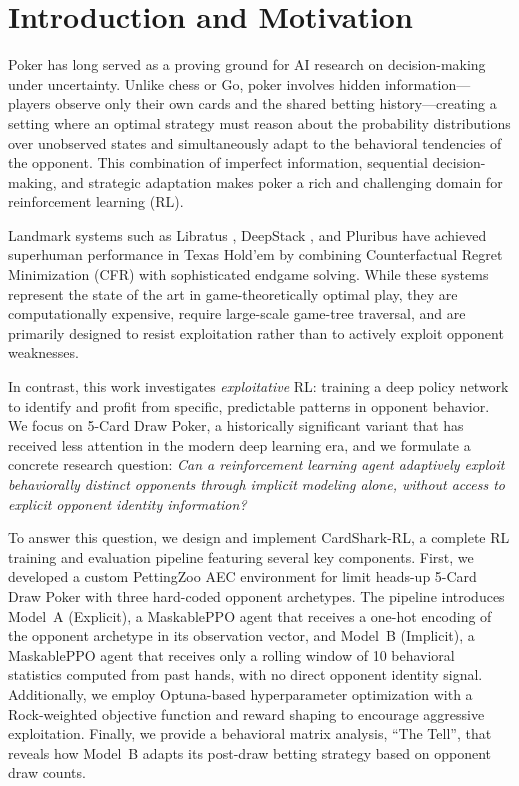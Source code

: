 \documentclass[conference]{IEEEtran}
\begin{document}
\section{Introduction and Motivation}
\label{sec:intro}

Poker has long served as a proving ground for AI research on
decision-making under uncertainty. Unlike chess or Go, poker involves
hidden information---players observe only their own cards and the
shared betting history---creating a setting where an optimal strategy
must reason about the probability distributions over unobserved states
and simultaneously adapt to the behavioral tendencies of the opponent.
This combination of imperfect information, sequential decision-making,
and strategic adaptation makes poker a rich and challenging domain for
reinforcement learning (RL).

Landmark systems such as Libratus \cite{brown2018libratus}, DeepStack
\cite{moravcik2017deepstack}, and Pluribus \cite{brown2019superhuman}
have achieved superhuman performance in Texas Hold'em by combining
Counterfactual Regret Minimization (CFR) \cite{zinkevich2007regret}
with sophisticated endgame solving. While these systems represent the
state of the art in game-theoretically optimal play, they are
computationally expensive, require large-scale game-tree traversal,
and are primarily designed to resist exploitation rather than to
actively exploit opponent weaknesses.

In contrast, this work investigates \textit{exploitative} RL:
training a deep policy network to identify and profit from specific,
predictable patterns in opponent behavior. We focus on 5-Card Draw
Poker, a historically significant variant that has received less
attention in the modern deep learning era, and we formulate a concrete
research question: \textit{Can a reinforcement learning agent
adaptively exploit behaviorally distinct opponents through implicit
modeling alone, without access to explicit opponent identity
information?}

To answer this question, we design and implement CardShark-RL, a complete RL training and evaluation pipeline featuring several key components. First, we developed a custom PettingZoo AEC environment for limit heads-up 5-Card Draw Poker with three hard-coded opponent archetypes. The pipeline introduces Model~A (Explicit), a MaskablePPO agent that receives a one-hot encoding of the opponent archetype in its observation vector, and Model~B (Implicit), a MaskablePPO agent that receives only a rolling window of 10 behavioral statistics computed from past hands, with no direct opponent identity signal. Additionally, we employ Optuna-based hyperparameter optimization with a Rock-weighted objective function and reward shaping to encourage aggressive exploitation. Finally, we provide a behavioral matrix analysis, ``The Tell'', that reveals how Model~B adapts its post-draw betting strategy based on opponent draw counts.
\end{document}
